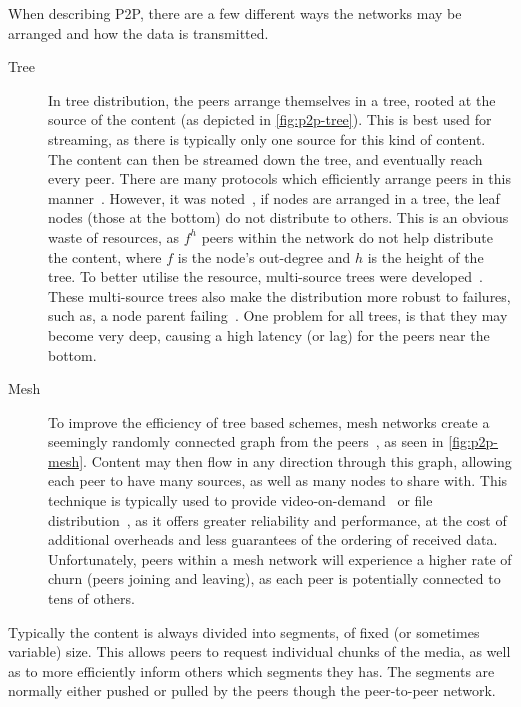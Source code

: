    When describing P2P, there are a few different ways the networks may be arranged and how the data is transmitted.
\begin{description}
  \item[Tree] In tree distribution, the peers arrange themselves in a tree, rooted at the source of the content (as depicted in \autoref{fig:p2p-tree}). This is best used for streaming, as there is typically only one source for this kind of content. The content can then be streamed down the tree, and eventually reach every peer. There are many protocols which efficiently arrange peers in this manner~\cite{mathy01otb,banerjee2002sal,tran2003zae}. However, it was noted~\cite{castro2003shb}, if nodes are arranged in a tree, the leaf nodes (those at the bottom) do not distribute to others. This is an obvious waste of resources, as $f^h$ peers within the network do not help distribute the content, where $f$ is the node's out-degree and $h$ is the height of the tree. To better utilise the resource, multi-source trees were developed~\cite{begen2003mps,castro2003shb}. These multi-source trees also make the distribution more robust to failures, such as, a node parent failing~\cite{do2004ppf}. One problem for all trees, is that they may become very deep, causing a high latency (or lag) for the peers near the bottom.

  \item[Mesh] To improve the efficiency of tree based schemes, mesh networks create a seemingly randomly connected graph from the peers~\cite{kostic2003bhb,liao2006app,magharei2007ppp,hei2008iop}, as seen in \autoref{fig:p2p-mesh}. Content may then flow in any direction through this graph, allowing each peer to have many sources, as well as many nodes to share with. This technique is typically used to provide video-on-demand~\cite{annapureddy2006pvd} or file distribution~\cite{cohen03ibr}, as it offers greater reliability and performance, at the cost of additional overheads and less guarantees of the ordering of received data. Unfortunately, peers within a mesh network will experience a higher rate of churn (peers joining and leaving), as each peer is potentially connected to tens of others.
\end{description}

Typically the content is always divided into segments, of fixed (or sometimes variable) size. This allows peers to request individual chunks of the media, as well as to more efficiently inform others which segments they has. The segments are normally either pushed or pulled by the peers though the peer-to-peer network.

